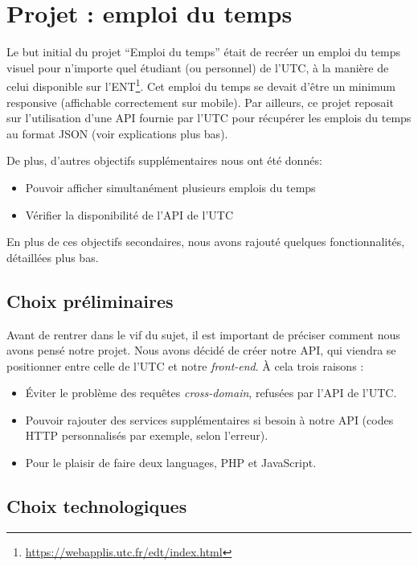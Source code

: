 \chapter{Projet : emploi du temps}

Le but initial du projet ``Emploi du temps'' était de recréer un emploi du temps visuel pour n'importe quel étudiant (ou personnel) de l'UTC, à la manière de celui disponible sur l'ENT\footnote{\url{https://webapplis.utc.fr/edt/index.html}}. Cet emploi du temps se devait d'être un minimum responsive (affichable correctement sur mobile). Par ailleurs, ce projet reposait sur l'utilisation d'une API fournie par l'UTC pour récupérer les emplois du temps au format JSON (voir explications plus bas).

\medskip

\noindent De plus, d'autres objectifs supplémentaires nous ont été donnés:
\begin{itemize}
  \item Pouvoir afficher simultanément plusieurs emplois du temps
  \item Vérifier la disponibilité de l'API de l'UTC
\end{itemize}
En plus de ces objectifs secondaires, nous avons rajouté quelques fonctionnalités, détaillées plus bas.

\section{Choix préliminaires}

Avant de rentrer dans le vif du sujet, il est important de préciser comment nous avons pensé notre projet. Nous avons décidé de créer notre API, qui viendra se positionner entre celle de l'UTC et notre \textit{front-end}. À cela trois raisons :

\begin{itemize}
  \item Éviter le problème des requêtes \textit{cross-domain}, refusées par l'API de l'UTC.
  \item Pouvoir rajouter des services supplémentaires si besoin à notre API (codes HTTP personnalisés par exemple, selon l'erreur).
  \item Pour le plaisir de faire deux languages, PHP et JavaScript.
\end{itemize}

\section{Choix technologiques}

